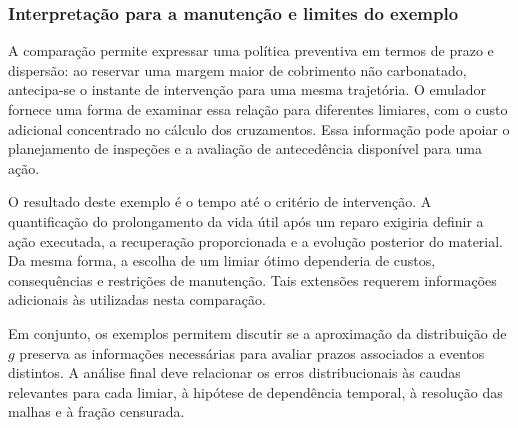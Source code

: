 
\subsubsection{Interpretação para a manutenção e limites do exemplo}

A comparação permite expressar uma política preventiva em termos de prazo e dispersão: ao reservar uma margem maior de cobrimento não carbonatado, antecipa-se o instante de intervenção para uma mesma trajetória. O emulador fornece uma forma de examinar essa relação para diferentes limiares, com o custo adicional concentrado no cálculo dos cruzamentos. Essa informação pode apoiar o planejamento de inspeções e a avaliação de antecedência disponível para uma ação.

O resultado deste exemplo é o tempo até o critério de intervenção. A quantificação do prolongamento da vida útil após um reparo exigiria definir a ação executada, a recuperação proporcionada e a evolução posterior do material. Da mesma forma, a escolha de um limiar ótimo dependeria de custos, consequências e restrições de manutenção. Tais extensões requerem informações adicionais às utilizadas nesta comparação.

Em conjunto, os exemplos permitem discutir se a aproximação da distribuição de $g$ preserva as informações necessárias para avaliar prazos associados a eventos distintos. A análise final deve relacionar os erros distribucionais às caudas relevantes para cada limiar, à hipótese de dependência temporal, à resolução das malhas e à fração censurada. 
